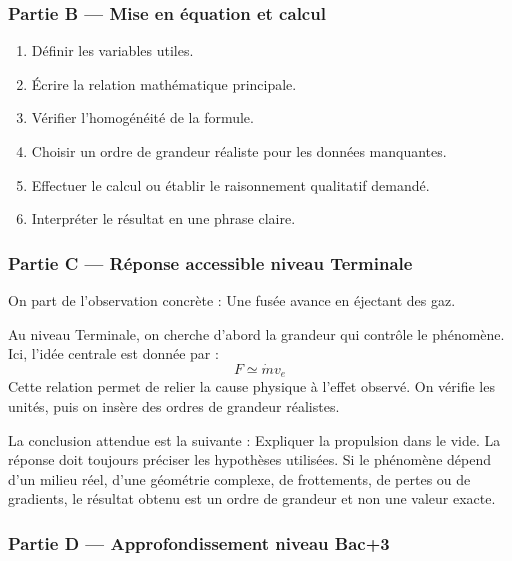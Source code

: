 \documentclass[11pt,a4paper]{article}
\begin{document}
\subsubsection*{Partie B — Mise en équation et calcul}

\begin{enumerate}
  \item Définir les variables utiles.
  \item Écrire la relation mathématique principale.
  \item Vérifier l'homogénéité de la formule.
  \item Choisir un ordre de grandeur réaliste pour les données manquantes.
  \item Effectuer le calcul ou établir le raisonnement qualitatif demandé.
  \item Interpréter le résultat en une phrase claire.
\end{enumerate}

\subsubsection*{Partie C — Réponse accessible niveau Terminale}

\begin{corrigebox}
On part de l'observation concrète : Une fusée avance en éjectant des gaz.

Au niveau Terminale, on cherche d'abord la grandeur qui contrôle le phénomène. Ici, l'idée centrale est donnée par :
\[
F\simeq\dot m v_e
\]
Cette relation permet de relier la cause physique à l'effet observé. On vérifie les unités, puis on insère des ordres de grandeur réalistes.

La conclusion attendue est la suivante : Expliquer la propulsion dans le vide. La réponse doit toujours préciser les hypothèses utilisées. Si le phénomène dépend d'un milieu réel, d'une géométrie complexe, de frottements, de pertes ou de gradients, le résultat obtenu est un ordre de grandeur et non une valeur exacte.
\end{corrigebox}

\subsubsection*{Partie D — Approfondissement niveau Bac+3}
\end{document}
